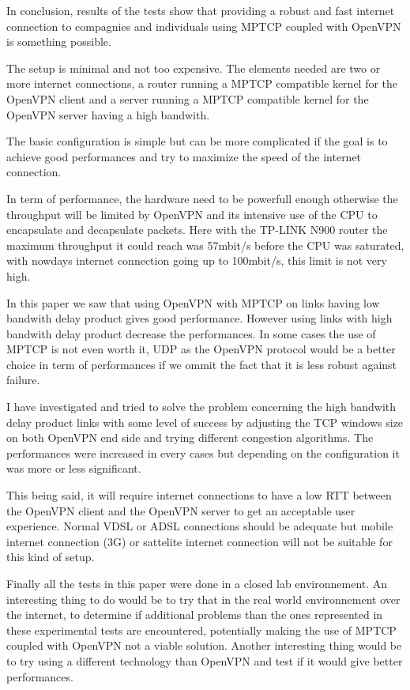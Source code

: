 

  In conclusion, results of the tests show that providing a robust and fast internet connection to compagnies and individuals using MPTCP coupled with OpenVPN is something possible.

  The setup is minimal and not too expensive. The elements needed are two or more internet connections, a router running a MPTCP compatible kernel for the OpenVPN client and
  a server running a MPTCP compatible kernel for the OpenVPN server having a high bandwith.

  The basic configuration is simple but can be more complicated if the goal is to achieve good performances and try to maximize the speed of the internet connection.

  In term of performance, the hardware need to be powerfull enough otherwise the throughput will be limited by OpenVPN and its intensive
  use of the CPU to encapsulate and decapsulate packets. Here with the TP-LINK N900 router the maximum throughput it could reach was 57mbit/s before the CPU was saturated, with
  nowdays internet connection going up to 100mbit/s, this limit is not very high.

  In this paper we saw that using OpenVPN with MPTCP on links having low bandwith delay product gives good performance.
  However using links with high bandwith delay product decrease the performances.
  In some cases the use of MPTCP is not even worth it, UDP as the OpenVPN protocol would be a better choice in term of performances if we ommit the fact that it is less robust against failure.

  I have investigated and tried to solve the problem concerning the high bandwith delay product links with some level of success by adjusting the
  TCP windows size on both OpenVPN end side and trying different congestion algorithms.
  The performances were increased in every cases but depending on the configuration it was more or less significant.

  This being said, it will require internet connections to have a low RTT between the OpenVPN client and the OpenVPN server to get an acceptable user experience.
  Normal VDSL or ADSL connections should be adequate but mobile internet connection (3G) or sattelite internet connection will not be suitable for this kind of setup.

  Finally all the tests in this paper were done in a closed lab environnement. An interesting thing to do would be to try that in the real world environnement over the internet, to determine
  if additional problems than the ones represented in these experimental tests are encountered, potentially making the use of MPTCP coupled with OpenVPN not a viable solution.
  Another interesting thing would be to try using a different technology than OpenVPN and test if it would give better performances.
